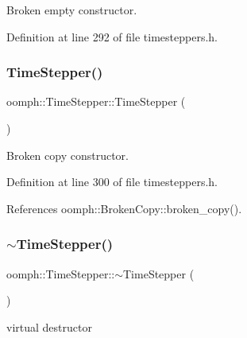 Broken empty constructor. 



Definition at line 292 of file timesteppers.\+h.

\mbox{\label{classoomph_1_1TimeStepper_a7aeeb26e2ce471978bf29641c10b3c1b}} 
\subsubsection{\texorpdfstring{Time\+Stepper()}{TimeStepper()}\hspace{0.1cm}{\footnotesize\ttfamily [3/3]}}
{\footnotesize\ttfamily oomph\+::\+Time\+Stepper\+::\+Time\+Stepper (\begin{DoxyParamCaption}\item[{const \hyperlink{classoomph_1_1TimeStepper}{Time\+Stepper} \&}]{ }\end{DoxyParamCaption})\hspace{0.3cm}{\ttfamily [inline]}}



Broken copy constructor. 



Definition at line 300 of file timesteppers.\+h.



References oomph\+::\+Broken\+Copy\+::broken\+\_\+copy().

\mbox{\label{classoomph_1_1TimeStepper_a171b5bbc223c889474ee38fd02eefc4d}} 
\subsubsection{\texorpdfstring{$\sim$\+Time\+Stepper()}{~TimeStepper()}}
{\footnotesize\ttfamily oomph\+::\+Time\+Stepper\+::$\sim$\+Time\+Stepper (\begin{DoxyParamCaption}{ }\end{DoxyParamCaption})\hspace{0.3cm}{\ttfamily [virtual]}}



virtual destructor 

